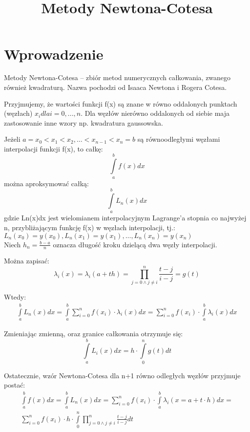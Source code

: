 \documentclass{article}
\begin{document}
\title{Metody Newtona-Cotesa}
\maketitle

\section*{Wprowadzenie}
Metody Newtona-Cotesa – zbiór metod numerycznych całkowania, zwanego również kwadraturą. Nazwa pochodzi od Isaaca Newtona i Rogera Cotesa.

Przyjmujemy, że wartości funkcji f(x) są znane w równo oddalonych punktach (węzłach) \( x_{i} dla i = 0 , . . . , n \). Dla węzłów nierówno oddalonych od siebie maja zastosowanie inne wzory np. kwadratura gaussowska.

Jeżeli $ a=x_{0}<x_{1}<x_{2},\dots <x_{n-1}<x_{n}=b $ są równoodległymi węzłami interpolacji funkcji f(x), to całkę: 
$$ \int \limits _{a}^{b}f(x)dx $$
można aproksymować całką: 
\begin{displaymath}
\int \limits _{a}^{b}L_{n}(x)dx
\end{displaymath} 
gdzie Ln(x)dx jest wielomianem interpolacyjnym Lagrange’a stopnia co najwyżej n, przybliżającym funkcję f(x) w węzłach interpolacji, tj.:
\begin{math} L_{n}(x_{0})=y(x_{0}),L_{n}(x_{1})=y(x_{1}),\dots ,L_{n}(x_{n})=y(x_{n}) \end{math}\\

Niech $ h_{n}={\frac {b-a}{n}} $ oznacza długość kroku dzielącą dwa węzły interpolacji. 

Można zapisać:
\begin{equation*}
\lambda _{i}(x)=\lambda _{i}(a+th)=\prod _{j=0\land j\neq i}^{n}{\frac {t-j}{i-j}}=g(t)
\end{equation*}

Wtedy:
\begin{gather*}
\int \limits _{a}^{b}L_{n}(x)dx=\int \limits _{a}^{b}\sum _{i=0}^{n}f(x_{i})\cdot \lambda _{i}(x)dx=\sum _{i=0}^{n}f(x_{i})\cdot \int \limits _{a}^{b}\lambda _{i}(x)dx
\end{gather*}

Zmieniając zmienną, oraz granice całkowania otrzymuje się: 
\[ \int \limits _{a}^{b}L_{i}(x)dx=h\cdot \int \limits _{0}^{n}g(t)dt \]

Ostatecznie, wzór Newtona-Cotesa dla n+1 równo odległych węzłów przyjmuje postać: 
\begin{multline*}
\int \limits _{a}^{b}f(x)dx=\int \limits _{a}^{b}L_{n}(x)dx=\sum _{i=0}^{n}f(x_{i})\cdot \int \limits _{a}^{b}\lambda _{i}(x=a+t\cdot h)dx=\\\sum _{i=0}^{n}f(x_{i})\cdot h\cdot \int \limits _{0}^{n}\prod _{j=0\land j\neq i}^{n}{\frac {t-j}{i-j}}dt
\end{multline*}
\end{document}
